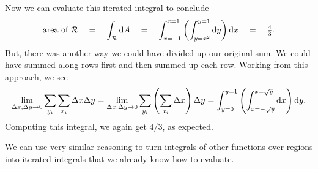 Now we can evaluate this iterated integral to conclude
\[
	\text{area of }\mathcal R
	\quad
	=\quad
	\int_{\mathcal R}\mathrm{d} A \quad=\quad 
	\int_{x=-1}^{x=1}\left(\int_{y=x^2}^{y=1} \mathrm{d} y\right)\mathrm{d} x \quad=\quad
	\tfrac{4}{3}.
\]
But, there was another way we could have divided up our original sum.  We could have summed
along rows first and then summed up each row.  Working from this approach, we see
\[
	\lim_{\Delta x,\Delta y\to 0} \sum_{y_i}\sum_{x_i} \Delta x\Delta y
	=
	\lim_{\Delta x,\Delta y\to 0} \sum_{y_i}\left(\sum_{x_i} \Delta x\right)\Delta y
	=\int_{y=0}^{y=1}\left(\int_{x=-\sqrt{y}}^{x=\sqrt{y}} \mathrm{d} x\right)\mathrm{d} y.
\]
Computing this integral, we again get $4/3$, as expected.

We can use very similar reasoning to turn integrals of other functions
over regions into iterated integrals that we already know how to evaluate.

